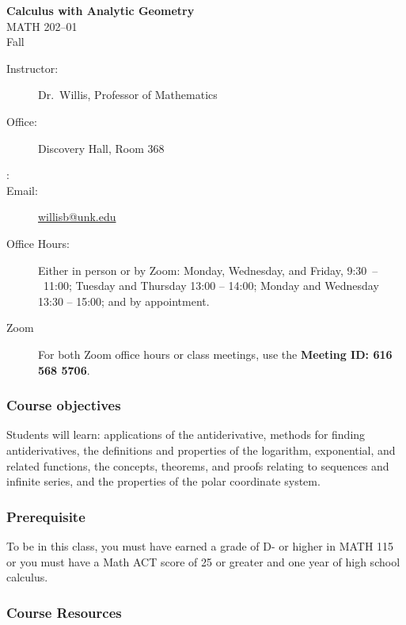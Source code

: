 \documentclass[12pt]{article}
\newcounter{ex}\setcounter{ex}{0}
\newcommand{\term}{Fall }
\newcommand{\RomanNumeralCaps}[1]
      {\MakeUppercase{\romannumeral #1}}
\newcommand{\coursename}{Calculus \RomanNumeralCaps{2} with Analytic Geometry}
\newcommand{\coursenumber}{MATH 202}
\newcommand{\sectionnumber}{01}
\begin{document}
\large
\begin{center}
    \textbf{\coursename}  \\
    {\coursenumber--\sectionnumber} \\
     {\term \the\year} \\
\end{center}

\vskip0.25in
\normalsize


\begin{center}
\begin{description}
    \item[Instructor:] Dr.\  Willis, Professor of Mathematics
    \item[Office:]  Discovery Hall,  Room 368
    \item[\phone:]  
    \item[Email:] \href{mailto:willisb@unk.edu}{willisb@unk.edu}
    \item[Office Hours:] Either in person or by Zoom: Monday, Wednesday, and  Friday, \mbox{9:30 -- 11:00}; Tuesday and Thursday 13:00 -- 14:00; Monday and Wednesday 13:30 -- 15:00;  and by appointment.
    \item[Zoom] For both Zoom office hours or class meetings, use the \textbf{Meeting ID: 616 568 5706}.
 \end{description}
\end{center}

\subsubsection*{Course objectives}

Students will learn: applications of the antiderivative, methods for finding antiderivatives, the definitions and properties of the logarithm, exponential, and related functions,
the concepts, theorems, and proofs relating to sequences and infinite series, and the properties of the polar coordinate system.

\subsubsection*{Prerequisite}

To be in this class, you must have earned a grade of D- or higher in 
MATH 115 or you must have a Math ACT score of 25 or greater and one year of high school calculus.


\subsubsection*{Course Resources}
\end{document}
